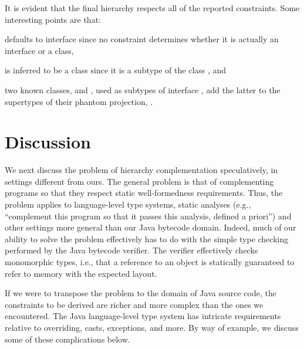 It is evident that the final hierarchy respects all of the reported
constraints. Some interesting points are that:
\begin{inparaenum}[(i)]
\item {} defaults to interface since no
  constraint determines whether it is actually an interface or a
  class,
\item {} is inferred to be a
  class since it is a subtype of the class , and
\item two known classes,
   and
  , used as subtypes of
  interface , add the latter to
  the supertypes of their phantom projection,
  .
\end{inparaenum}



\section{Discussion}
\label{hiercomp/discussion}

We next discuss the problem of hierarchy complementation speculatively,
in settings different from ours. The general problem is that of
complementing programs so that they respect static well-formedness
requirements. Thus, the problem applies to language-level type
systems, static analyses (e.g., ``complement this program so that it
passes this analysis, defined a priori'') and other settings more
general than our Java bytecode domain. Indeed, much of our ability to
solve the problem effectively has to do with the simple type
checking performed by the Java bytecode verifier. The verifier
effectively checks monomorphic types, i.e., that a reference to an
object is statically guaranteed to refer to memory with the expected
layout.

If we were to transpose the problem to the domain of Java source code,
the constraints to be derived are richer and more complex than
the ones we encountered.
The Java language-level type system has intricate requirements
relative to overriding, casts, exceptions, and more.  By way of
example, we discuss some of these complications below.

